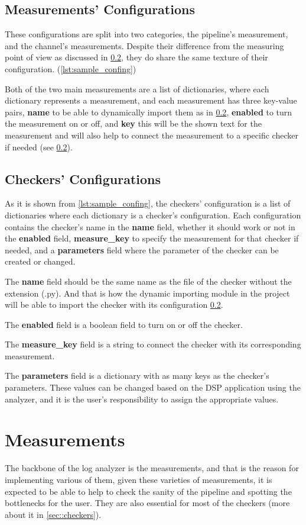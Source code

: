 \subsection{Measurements' Configurations}
These configurations are split into two categories, the pipeline's measurement, and
the channel's measurements. Despite their difference from the measuring point of view
as discussed in \ref{}, they do share the same texture of their configuration. (\ref{lst:sample_confing})

Both of the two main measurements are a list of dictionaries, where each dictionary
represents a measurement, and each measurement has three key-value pairs,
\textbf{name} to be able to dynamically import them as in \ref{}, \textbf{enabled}
to turn the measurement on or off, and \textbf{key} this will be the shown
text for the measurement and will also help to connect the measurement to 
a specific checker if needed (see \ref{}).

\subsection{Checkers' Configurations}
As it is shown from \ref{lst:sample_confing}, the checkers' configuration is a
list of dictionaries where each dictionary is a checker's configuration. Each configuration
contains the checker's name in the \textbf{name} field, whether it should work or not in
the \textbf{enabled} field, \textbf{measure\_key} to specify the measurement
for that checker if needed, and a \textbf{parameters} field where the parameter
of the checker can be created or changed.

The \textbf{name} field should be the same name as the file of the checker 
without the extension (.py). And that is how the dynamic importing module in 
the project will be able to import the checker with its configuration \ref{}.

The \textbf{enabled} field is a boolean field to turn on or off the checker.

The \textbf{measure\_key} field is a string to connect the checker with
its corresponding measurement.

The \textbf{parameters} field is a dictionary with as many keys as the checker's
parameters. These values can be changed based on the DSP application using the
analyzer, and it is the user's responsibility to assign the appropriate values.

\section{Measurements} \label{sec:measures}
The backbone of the log analyzer is the measurements, and that is the reason for implementing
various of them, given these varieties of measurements, it is expected to be able to 
help to check the sanity of the pipeline and spotting the bottlenecks for the user. They
are also essential for most of the checkers (more about it in \ref{sec::checkers}).

